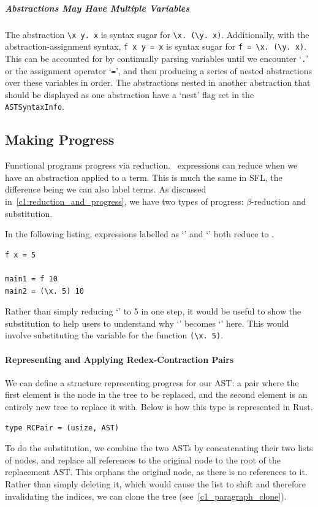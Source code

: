 \subparagraph{Abstractions May Have Multiple Variables}
The abstraction \verb|\x y. x| is syntax sugar for \newline\noindent\verb|\x. (\y. x)|. Additionally, with the abstraction-assignment syntax, \verb|f x y = x| is syntax sugar for \newline\noindent\verb|f = \x. (\y. x)|. This can be accounted for by continually parsing variables until we encounter `\verb|.|' or the assignment operator `\verb|=|', and then producing a series of nested abstractions over these variables in order. The abstractions nested in another abstraction that should be displayed as one abstraction have a `nest' flag set in the \verb|ASTSyntaxInfo|.

\subsection{Making Progress}
\label{c1_design_reduction_progress}
Functional programs progress via reduction. \lcalc\ expressions can reduce when we have an abstraction applied to a term. This is much the same in \ac{SFL}, the difference being we can also label terms. As discussed in~\ref{c1:reduction_and_progress}, we have two types of progress: $\beta$-reduction and substitution.

In the following listing, expressions labelled as `' and `' both reduce to . 
\begin{lstlisting}[language=SFL]
f x = 5

main1 = f 10 
main2 = (\x. 5) 10
\end{lstlisting}
\noindent Rather than simply reducing `' to 5 in one step, it would be useful to show the substitution to help users to understand why `' becomes `' here. This would involve substituting the variable  for the function \verb|(\x. 5)|. 

\paragraph{Representing and Applying Redex-Contraction Pairs}
We can define a structure representing progress for our \ac{AST}: a pair where the first element is the node in the tree to be replaced, and the second element is an entirely new tree to replace it with. Below is how this type is represented in Rust. 
\begin{lstlisting}[language=Rust_boxed]
type RCPair = (usize, AST)
\end{lstlisting}
\noindent To do the substitution, we combine the two \ac{AST}s by concatenating their two lists of nodes, and replace all references to the original node to the root of the replacement \ac{AST}. This orphans the original node, as there is no references to it. Rather than simply deleting it, which would cause the list to shift and therefore invalidating the indices, we can clone the tree (see~\ref{c1_paragraph_clone}). 

